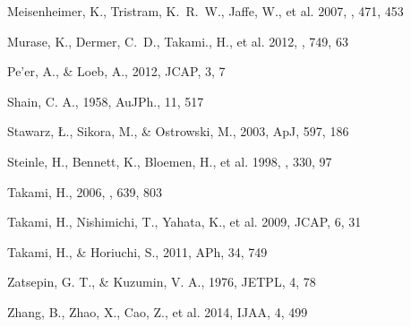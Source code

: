 \documentclass{aastex6}
\begin{document}
\begin{thebibliography}{99}
 Meisenheimer, K., Tristram, K.~R.~W., Jaffe, W., et al. 2007, \aap, 471, 453

 Murase, K., Dermer, C.~D., Takami., H., et al. 2012, \apj, 749, 63 

 Pe'er, A., \& Loeb, A., 2012, JCAP, 3, 7

 Shain, C. A., 1958, AuJPh., 11, 517

 Stawarz, \L., Sikora, M., \& Ostrowski, M., 2003, ApJ, 597, 186

 Steinle, H., Bennett, K., Bloemen, H., et al. 1998, \aap, 330, 97

 Takami, H., 2006, \apj, 639, 803

 Takami, H., Nishimichi, T., Yahata, K., et al. 2009, JCAP, 6, 31 

 Takami, H., \& Horiuchi, S., 2011, APh, 34, 749

 Zatsepin, G. T., \& Kuzumin, V. A., 1976, JETPL, 4, 78

 Zhang, B., Zhao, X., Cao, Z., et al. 2014, IJAA, 4, 499



\end{thebibliography}
\end{document}
